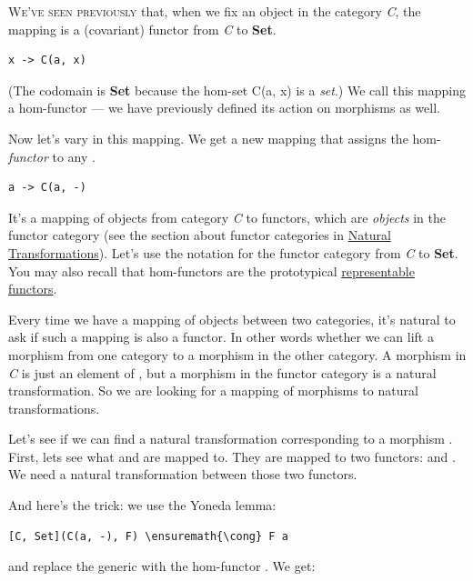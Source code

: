 \lettrine[lhang=0.17]{W}{e've seen previously} that, when we fix an object  in the
category \emph{C}, the mapping  is a (covariant)
functor from \emph{C} to \textbf{Set}.

\begin{Verbatim}[commandchars=\\\{\}]
x -> C(a, x)
\end{Verbatim}
(The codomain is \textbf{Set} because the hom-set C(a, x) is a
\emph{set}.) We call this mapping a hom-functor --- we have previously
defined its action on morphisms as well.

Now let's vary  in this mapping. We get a new mapping that
assigns the hom-\emph{functor}  to any .

\begin{Verbatim}[commandchars=\\\{\}]
a -> C(a, -)
\end{Verbatim}
It's a mapping of objects from category \emph{C} to functors, which are
\emph{objects} in the functor category (see the section about functor
categories in
\hyperref[natural-transformations]{Natural
Transformations}). Let's use the notation \code{{[}C, Set{]}} for the
functor category from \emph{C} to \textbf{Set}. You may also recall that
hom-functors are the prototypical
\hyperref[chap-representable-functors]{representable
functors}.

Every time we have a mapping of objects between two categories, it's
natural to ask if such a mapping is also a functor. In other words
whether we can lift a morphism from one category to a morphism in the
other category. A morphism in \emph{C} is just an element of
, but a morphism in the functor category
\code{{[}C, Set{]}} is a natural transformation. So we are looking
for a mapping of morphisms to natural transformations.

Let's see if we can find a natural transformation corresponding to a
morphism . First, lets see what
 and  are mapped to. They are mapped to two
functors:  and . We need a natural
transformation between those two functors.

And here's the trick: we use the Yoneda lemma:

\begin{Verbatim}[commandchars=\\\{\}]
[C, Set](C(a, -), F) \ensuremath{\cong} F a
\end{Verbatim}
and replace the generic  with the hom-functor
. We get:


